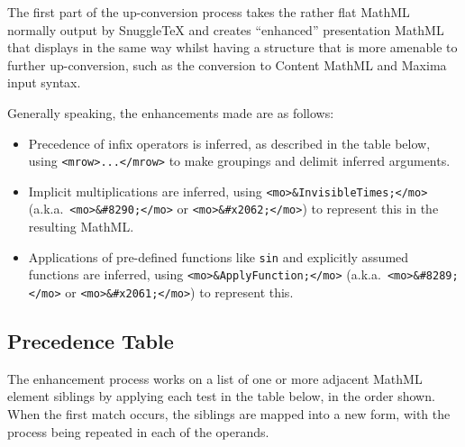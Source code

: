
\newcommand{\ue}[1]{\upConversionExample{#1}}

The first part of the up-conversion process takes the rather flat MathML normally
output by SnuggleTeX and creates ``enhanced'' presentation MathML that displays in the
same way whilst having a structure that is more amenable to further up-conversion,
such as the conversion to Content MathML and Maxima input syntax.

Generally speaking, the enhancements made are as follows:

\begin{itemize}
\item Precedence of infix operators is inferred, as described in the table
below, using \verb|<mrow>...</mrow>| to make groupings and delimit inferred arguments.
\item Implicit multiplications are inferred, using \verb|<mo>&InvisibleTimes;</mo>|
(a.k.a.\ \verb|<mo>&#8290;</mo>| or \verb|<mo>&#x2062;</mo>|)
to represent this in the resulting MathML.
\item Applications of pre-defined functions like \verb|sin| and explicitly assumed
functions are inferred, using
\verb|<mo>&ApplyFunction;</mo>| (a.k.a.\ \verb|<mo>&#8289;</mo>| or \verb|<mo>&#x2061;</mo>|)
to represent this.
\end{itemize}

\subsection*{Precedence Table}

The enhancement process works on a list of one or more adjacent MathML element siblings by applying
each test in the table below, in the order shown. When the first match occurs,
the siblings are mapped into a new form, with the process being repeated in each of the operands.

